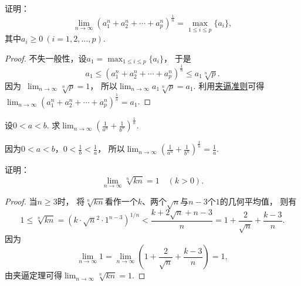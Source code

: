 \begin{example}\label{equation:数列极限.重要极限6}
证明：\begin{equation}
	\lim_{n\to\infty} (a_1^n + a_2^n + \dotsb + a_p^n)^{\frac1n}
	= \max_{1\leq i\leq p} \{a_i\},
\end{equation}
其中\(a_i\geq0\ (i=1,2,\dotsc,p)\).
\begin{proof}
不失一般性，设\(a_1 = \max_{1\leq i\leq p} \{a_i\}\)，
于是\[
	a_1 \leq (a_1^n + a_2^n + \dotsb + a_p^n)^{\frac1n} \leq a_1 \sqrt[n]{p}.
\]
因为~\hyperref[example:极限.常数的方根的极限2]{\(\lim_{n\to\infty} \sqrt[n]{p} = 1\)}，
所以\(\lim_{n\to\infty} a_1 \sqrt[n]{p} = a_1\).
利用\hyperref[theorem:数列极限.夹逼准则]{夹逼准则}可得
\(\lim_{n\to\infty} (a_1^n + a_2^n + \dotsb + a_p^n)^{\frac1n} = a_1\).
\end{proof}
\end{example}
\begin{example}
设\(0<a<b\).
求\(\lim_{n\to\infty} \left( \frac1{a^n} + \frac1{b^n} \right)^{\frac1n}\).
\begin{solution}
因为\(0<a<b\)，\(0<\frac1b<\frac1a\)，
所以\(\lim_{n\to\infty} \left( \frac1{a^n} + \frac1{b^n} \right)^{\frac1n} = \frac1a\).
\end{solution}
\end{example}

\begin{example}
证明：\begin{equation}\label{equation:数列极限.重要极限3}
	\lim_{n\to\infty} \sqrt[n]{k n} = 1
	\quad(k>0).
\end{equation}
\begin{proof}
当\(n \geq 3\)时，
将\(\sqrt[n]{k n}\)看作一个\(k\)、两个\(\sqrt{n}\)与\(n-3\)个\(1\)的几何平均值，
则有\[
	1 \leq \sqrt[n]{k n} = (k \cdot \sqrt{n}^2 \cdot 1^{n-3})^{1/n}
	< \frac{k + 2\sqrt{n} + n-3}{n}
	= 1 + \frac{2}{\sqrt{n}} + \frac{k-3}{n}.
\]
因为\[
	\lim_{n\to\infty} 1
	= \lim_{n\to\infty} \left(1 + \frac{2}{\sqrt{n}} + \frac{k-3}{n}\right) = 1,
\]
由夹逼定理可得\(\lim_{n\to\infty} \sqrt[n]{k n} = 1\).
\end{proof}
\end{example}

